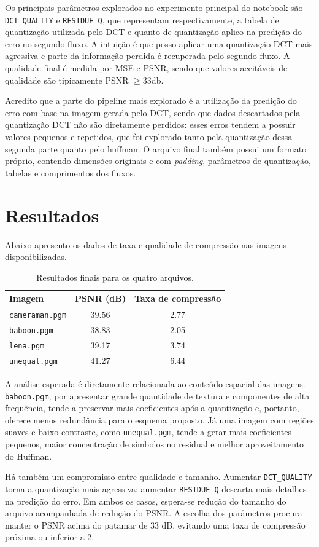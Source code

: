 \documentclass{article}
\newcommand{\cameramanPSNR}{39.56}
\newcommand{\cameramanRate}{2.77}
\newcommand{\baboonPSNR}{38.83}
\newcommand{\baboonRate}{2.05}
\newcommand{\lenaPSNR}{39.17}
\newcommand{\lenaRate}{3.74}
\newcommand{\unequalPSNR}{41.27}
\newcommand{\unequalRate}{6.44}
\begin{document}
Os principais parâmetros explorados no experimento principal do notebook são \texttt{DCT\_QUALITY} e \texttt{RESIDUE\_Q}, que representam respectivamente, a tabela de quantização utilizada pelo DCT e quanto de quantização aplico na predição do erro no segundo fluxo. A intuição é que posso aplicar uma quantização DCT mais agressiva e parte da informação perdida é recuperada pelo segundo fluxo. A qualidade final é medida por MSE e PSNR, sendo que valores aceitáveis de qualidade são tipicamente PSNR $\ge 33$db. 

Acredito que a parte do pipeline mais explorado é a utilização da predição do erro com base na imagem gerada pelo DCT, sendo que dados descartados pela quantização DCT não são diretamente perdidos: esses erros tendem a possuir valores pequenos e repetidos, que foi explorado tanto pela quantização dessa segunda parte quanto pelo huffman. O arquivo final também possui um formato próprio, contendo dimensões originais e com \textit{padding}, parâmetros de quantização, tabelas e comprimentos dos fluxos.

\section{Resultados}

Abaixo apresento os dados de taxa e qualidade de compressão nas imagens disponibilizadas.

\begin{table}[H]
\centering
\caption{Resultados finais para os quatro arquivos.}
\label{tab:resultados}
\begin{tabular}{lcc}
\toprule
Imagem & PSNR (dB) & Taxa de compressão \\
\midrule
\texttt{cameraman.pgm} & \cameramanPSNR & \cameramanRate \\
\texttt{baboon.pgm}    & \baboonPSNR    & \baboonRate \\
\texttt{lena.pgm}      & \lenaPSNR      & \lenaRate \\
\texttt{unequal.pgm}   & \unequalPSNR   & \unequalRate \\
\bottomrule
\end{tabular}
\end{table}

A análise esperada é diretamente relacionada ao conteúdo espacial das imagens. \texttt{baboon.pgm}, por apresentar grande quantidade de textura e componentes de alta frequência, tende a preservar mais coeficientes após a quantização e, portanto, oferece menos redundância para o esquema proposto. Já uma imagem com regiões suaves e baixo contraste, como \texttt{unequal.pgm}, tende a gerar mais coeficientes pequenos, maior concentração de símbolos no residual e melhor aproveitamento do Huffman.

Há também um compromisso entre qualidade e tamanho. Aumentar \texttt{DCT\_QUALITY} torna a quantização mais agressiva; aumentar \texttt{RESIDUE\_Q} descarta mais detalhes na predição do erro. Em ambos os casos, espera-se redução do tamanho do arquivo acompanhada de redução do PSNR. A escolha dos parâmetros procura manter o PSNR acima do patamar de 33 dB, evitando uma taxa de compressão próxima ou inferior a 2.
\end{document}
